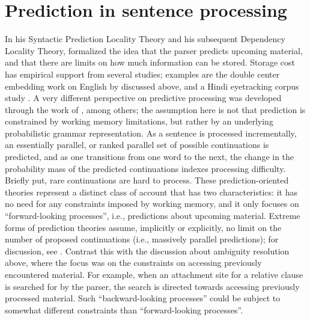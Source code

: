 \documentclass{cambridge7A}\usepackage[]{graphicx}\usepackage[]{color}
\begin{document}
\section{Prediction in sentence processing}

In his Syntactic Prediction Locality Theory \citep{Gibson1998} and his 
subsequent Dependency Locality Theory, \cite{Gibson2000} formalized
the idea that the parser predicts upcoming material, and that there
are limits on how much information can be stored. Storage
cost has empirical support from several studies; examples are the double
center embedding work on English by \cite{gibsonthomas97} discussed
above, and a Hindi eyetracking corpus study
\citep{HusainVasishthNarayanan2015}. A very different perspective on 
predictive processing was developed through the work of
\cite{Jurafsky1996,Hale2001,Levy2008}, among others; the assumption
here is not that prediction is constrained by working memory
limitations, but rather by an underlying probabilistic grammar 
representation. As a sentence is processed incrementally, an  
essentially parallel, or ranked parallel set of possible continuations 
is predicted, and as one transitions from one word to the next, the
change in the probability mass of the predicted continuations indexes
processing difficulty. Briefly put, rare continuations are hard to
process. These prediction-oriented theories represent a distinct class of
account that has two characteristics: it has no need for any
constraints imposed by working memory, and it only focuses on 
``forward-looking processes'', i.e., predictions about upcoming
material. Extreme forms of prediction theories assume, implicitly or explicitly, no limit on the number of proposed continuations (i.e., massively parallel predictions); for discussion, see \cite{BostonHaleVasishth2011}.
Contrast this with the discussion about ambiguity resolution
above, where the focus was on the constraints on accessing previously encountered material. For
example, when an attachment site for a relative clause is searched for 
by the parser, the search is directed towards accessing previously processed 
material. 
Such ``backward-looking processes'' could be subject to somewhat different constraints than ``forward-looking processes''.
\end{document}
